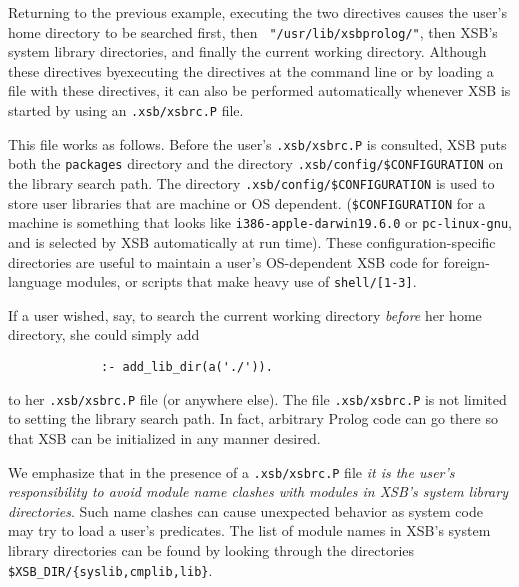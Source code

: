Returning to the previous example, executing the two directives causes
the user's home directory to be searched first, then {\tt
  "/usr/lib/xsbprolog/"}, then XSB's system library directories, and
finally the current working directory.  Although these directives
byexecuting the directives at the command line or by loading a file
with these directives, it can also be performed automatically whenever
XSB is started by using an {\tt .xsb/xsbrc.P} file.

This file works as follows.  Before the user's {\verb|.xsb/xsbrc.P|}
is consulted, XSB puts both the {\tt packages} directory and the
directory \verb|.xsb/config/$CONFIGURATION| on the library search
path.  The directory \verb'.xsb/config/$CONFIGURATION' is used to
store user libraries that are machine or OS
dependent. (\verb'$CONFIGURATION' for a machine is something that
looks like {\tt i386-apple-darwin19.6.0} or {\tt pc-linux-gnu}, and is
selected by XSB automatically at run time).  These
configuration-specific directories are useful to maintain a user's
OS-dependent XSB code for foreign-language modules, or scripts that
make heavy use of {\tt shell/[1-3]}.

If a user wished, say, to search the current working directory {\em
  before} her home directory, she could simply add
\begin{verbatim}
             :- add_lib_dir(a('./')).
\end{verbatim}
to her {\verb|.xsb/xsbrc.P|} file (or anywhere else).  The file
{\verb|.xsb/xsbrc.P|} is not limited to setting the library search
path.  In fact, arbitrary Prolog code can go there so that XSB can be
initialized in any manner desired.

We emphasize that in the presence of a {\verb|.xsb/xsbrc.P|} file {\em
it is the user's responsibility to avoid module name clashes with
modules in XSB's system library directories}.  Such name clashes can
cause unexpected behavior as system code may try to load a user's
predicates.  The list of module names in XSB's system library
directories can be found by looking through the directories {\tt
\$XSB\_DIR/\{syslib,cmplib,lib\}}.

